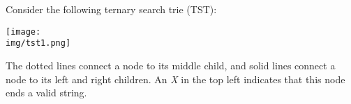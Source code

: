 \clearpage
{}

Consider the following ternary search trie (TST):
\begin{center}
\texttt{[image: \\img/tst1.png]}
\end{center}

The dotted lines connect a node to its middle child, and
solid lines connect a node to its left and
right children.  An \emph{X} in the top left indicates that this
node ends a valid string.


